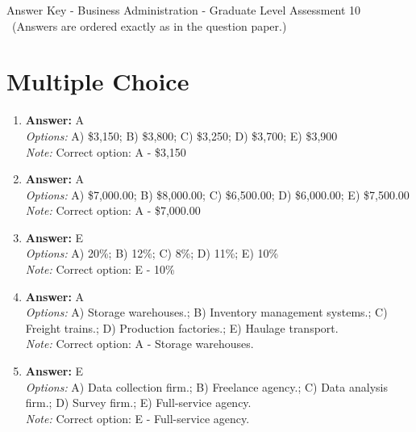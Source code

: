 \documentclass[12pt]{article}
\begin{document}
\begin{center}
Answer Key - Business Administration - Graduate Level Assessment 10 \
\small (Answers are ordered exactly as in the question paper.)
\end{center}

\section*{Multiple Choice}
\begin{enumerate}[label=\arabic*.]
\item \textbf{Answer:} A
\\ \textit{Options:} A) \$3,150; B) \$3,800; C) \$3,250; D) \$3,700; E) \$3,900
\\ \textit{Note:} Correct option: A - \$3,150
\item \textbf{Answer:} A
\\ \textit{Options:} A) \$7,000.00; B) \$8,000.00; C) \$6,500.00; D) \$6,000.00; E) \$7,500.00
\\ \textit{Note:} Correct option: A - \$7,000.00
\item \textbf{Answer:} E
\\ \textit{Options:} A) 20\%; B) 12\%; C) 8\%; D) 11\%; E) 10\%
\\ \textit{Note:} Correct option: E - 10\%
\item \textbf{Answer:} A
\\ \textit{Options:} A) Storage warehouses.; B) Inventory management systems.; C) Freight trains.; D) Production factories.; E) Haulage transport.
\\ \textit{Note:} Correct option: A - Storage warehouses.
\item \textbf{Answer:} E
\\ \textit{Options:} A) Data collection firm.; B) Freelance agency.; C) Data analysis firm.; D) Survey firm.; E) Full-service agency.
\\ \textit{Note:} Correct option: E - Full-service agency.
\end{enumerate}
\end{document}
